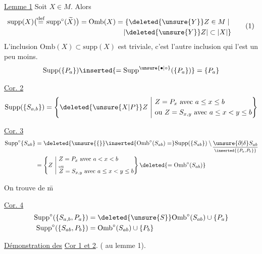 \uline{Lemme 1} Soit $X\in M$. Alors
\[
\begin{aligned}
 \mathrm{supp}(X)\bigl(\overset{\text{def}}{=}\mathrm{supp}^{\circ}(\widetilde X)\bigr)
 &=\mathrm{Omb}(X)=\{ \deleted{\unsure{Y}}Z\in M\mid\\
 &\hspace{22mm}|\deleted{\unsure{Y}}Z|\subset |X|\}
\end{aligned}\tag*{(1)}
\]
L'inclusion $\mathrm{Omb}(X)\subset\mathrm{supp}(X)$ est triviale, c'est l'autre inclusion qui l'est un peu moins.
\[
 \mathrm{Supp}(\{P_a\})\inserted{=\mathrm{Supp}^{\unsure{\bullet|\circ}}(\{P_a\})}=\{P_a\}
\]

\uline{Cor. 2}
\[
 \mathrm{Supp}(\{S_{a,b}\})=
 \left\{\deleted{\unsure{X|P}}Z\ \middle|\
 \begin{aligned}&Z=P_x\ \text{avec }a\leq x\leq b\\
 &\text{ou }Z=S_{x,y}\ \text{avec }a\leq x<y\leq b\end{aligned}
 \right\}
\]

\uline{Cor. 3}
\[
\begin{aligned}
 \mathrm{Supp}^{\circ}\{S_{ab}\}
 &=\deleted{\unsure{\{}}\inserted{\mathrm{Omb}^{\circ}(S_{ab})=}
 \mathrm{Supp}(\{S_{ab}\})\setminus\underset{\inserted{\{P_a,P_b\}}}{\underline{\unsure{\partial|\delta}S_{ab}}}\\
 &=\left\{Z\ \middle|\
 \begin{aligned}&Z=P_x\ \text{avec }a<x<b\\
 &\overset{\text{ou}}{Z}=S_{x,y}\ \text{avec }a\leq x<y\leq b\end{aligned}\right\}
 \deleted{=\mathrm{Omb}^{\circ}(S_{ab})}
\end{aligned}
\]

On trouve de \={m}

\uline{Cor. 4}
\[
\begin{aligned}
 \mathrm{Supp}^{\circ}(\{S_{a,b},P_a\})&=\deleted{\unsure{S}}\mathrm{Omb}^{\circ}(S_{ab})\cup\{P_a\}\\
 \mathrm{Supp}^{\circ}(\{S_{ab},P_b\})&=\mathrm{Omb}^{\circ}(S_{ab})\cup\{P_b\}
\end{aligned}
\]

\uline{Démonstration des} \uline{Cor 1 et 2}. ( au lemme 1).

